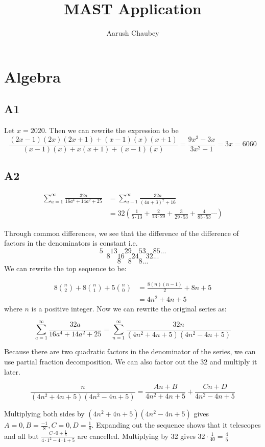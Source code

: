\documentclass[11pt]{scrartcl}
\title{MAST Application}
\author{Aarush Chaubey}
\date{}
\begin{document}
\maketitle

\section*{Algebra}
\subsection*{A1}
Let $x=2020$. Then we can rewrite the expression to be
$$\frac{(2x-1)(2x)(2x+1)+(x-1)(x)(x+1)}{(x-1)(x)+x(x+1)+(x-1)(x)} = \frac{9x^3-3x}{3x^2-1}=3x=\boxed{6060}$$

\subsection*{A2}
\begin{align*}
\sum_{a=1}^{\infty} \frac{32a}{16a^4+14a^2+25} &= \sum_{a-1}^{\infty}\frac{32a}{(4a+3)^2+16}\\
&= 32(\frac{1}{5\cdot13}+\frac{2}{13\cdot29}+\frac{3}{29\cdot53}+\frac{4}{85\cdot53}\cdots)
\end{align*}

Through common differences, we see that the difference of the difference of factors in the denominators is constant i.e.
$$5 \quad 13 \quad 29 \quad 53 \quad 85...$$
$$8 \quad 16 \quad 24 \quad 32...$$
$$8 \quad 8 \quad 8...$$
We can rewrite the top sequence to be:

\begin{align*}
8\binom{n}{2}+8\binom{n}{1}+5\binom{n}{0}
&=\frac{8(n)(n-1)}{2}+8n+5\\
&=4n^2+4n+5
\end{align*}
where $n$ is a positive integer.
Now we can rewrite the original series as:

$$\sum_{a=1}^{\infty} \frac{32a}{16a^4+14a^2+25}=\sum_{n=1}^{\infty} \frac{32n}{(4n^2+4n+5)(4n^2-4n+5)}$$

Because there are two quadratic factors in the denominator of the series, we can use partial fraction decomposition. We can also factor out the 32 and multiply it later.

$$\frac{n}{(4n^2+4n+5)(4n^2-4n+5)} = \frac{An+B}{4n^2+4n+5}+\frac{Cn+D}{4n^2-4n+5}$$

\vspace{5mm}
Multiplying both sides by $(4n^2+4n+5)(4n^2-4n+5)$ gives $A=0, B=\frac{-1}{8}, C=0, D=\frac{1}{8}.$ Expanding out the sequence shows that it telescopes and all but $\frac{C\cdot0+\frac{1}{8}}{4\cdot1^2-4\cdot1+5}$ are cancelled. Multiplying by 32 gives $32\cdot\frac{1}{40}=\boxed{\frac{4}{5}}$
\end{document}
